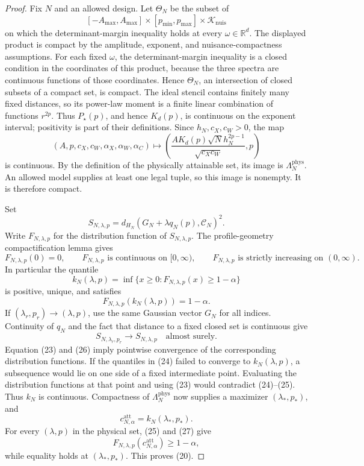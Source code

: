 \documentclass{article}
\begin{document}
\begin{proof}
Fix \(N\) and an allowed design.  Let \(\Theta_N\) be the subset of
\[
[-A_{\max},A_{\max}]\times[p_{\min},p_{\max}]
   \times\mathcal K_{\mathrm{nuis}}
\]
on which the determinant-margin inequality holds at every \(\omega\in\mathbb R^d\).  The displayed product is compact by the amplitude, exponent, and nuisance-compactness assumptions.  For each fixed \(\omega\), the determinant-margin inequality is a closed condition in the coordinates of this product, because the three spectra are continuous functions of those coordinates.  Hence \(\Theta_N\), an intersection of closed subsets of a compact set, is compact.  The ideal stencil contains finitely many fixed distances, so its power-law moment is a finite linear combination of functions \(r^{2p}\).  Thus \(P_\star(p)\), and hence \(K_d(p)\), is continuous on the exponent interval; positivity is part of their definitions.  Since \(h_N,c_X,c_W>0\), the map
\[
(A,p,c_X,c_W,\alpha_X,\alpha_W,\alpha_C)
 \longmapsto
 \left(\frac{A K_d(p)\sqrt N h_N^{2p-1}}{\sqrt{c_Xc_W}},p\right)             \tag{22}
\]
is continuous.  By the definition of the physically attainable set, its image is \(\Lambda_N^{\mathrm{phys}}\).  An allowed model supplies at least one legal tuple, so this image is nonempty.  It is therefore compact.

Set
\[
S_{N,\lambda,p}=d_{H_N}(G_N+\lambda q_N(p),\mathcal C_N)^2.
\]
Write \(F_{N,\lambda,p}\) for the distribution function of \(S_{N,\lambda,p}\).  The profile-geometry compactification lemma gives
\[
F_{N,\lambda,p}(0)=0,
\qquad F_{N,\lambda,p}\text{ is continuous on }[0,\infty),
\qquad F_{N,\lambda,p}\text{ is strictly increasing on }(0,\infty).         \tag{23}
\]
In particular the quantile
\[
k_N(\lambda,p)=\inf\{x\ge0:F_{N,\lambda,p}(x)\ge1-\alpha\}                 \tag{24}
\]
is positive, unique, and satisfies
\[
F_{N,\lambda,p}(k_N(\lambda,p))=1-\alpha.                                \tag{25}
\]
If \((\lambda_r,p_r)\to(\lambda,p)\), use the same Gaussian vector \(G_N\) for all indices.  Continuity of \(q_N\) and the fact that distance to a fixed closed set is continuous give
\[
S_{N,\lambda_r,p_r}\longrightarrow S_{N,\lambda,p}
\quad\text{almost surely}.                                                    \tag{26}
\]
Equation (23) and (26) imply pointwise convergence of the corresponding distribution functions.  If the quantiles in (24) failed to converge to \(k_N(\lambda,p)\), a subsequence would lie on one side of a fixed intermediate point.  Evaluating the distribution functions at that point and using (23) would contradict (24)--(25).  Thus \(k_N\) is continuous.  Compactness of \(\Lambda_N^{\mathrm{phys}}\) now supplies a maximizer \((\lambda_*,p_*)\), and
\[
c_{N,\alpha}^{\mathrm{att}}=k_N(\lambda_*,p_*).                              \tag{27}
\]
For every \((\lambda,p)\) in the physical set, (25) and (27) give
\[
F_{N,\lambda,p}(c_{N,\alpha}^{\mathrm{att}})\ge1-\alpha,
\]
while equality holds at \((\lambda_*,p_*)\).  This proves (20).


\end{proof}
\end{document}
